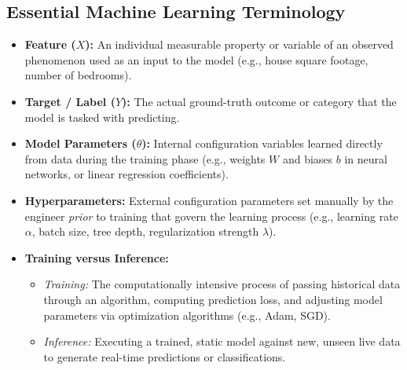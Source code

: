 \subsection{Essential Machine Learning Terminology}
\begin{itemize}
    \item \textbf{Feature ($X$):} An individual measurable property or variable of an observed phenomenon used as an input to the model (e.g., house square footage, number of bedrooms).
    \item \textbf{Target / Label ($Y$):} The actual ground-truth outcome or category that the model is tasked with predicting.
    \item \textbf{Model Parameters ($\theta$):} Internal configuration variables learned directly from data during the training phase (e.g., weights $W$ and biases $b$ in neural networks, or linear regression coefficients).
    \item \textbf{Hyperparameters:} External configuration parameters set manually by the engineer \textit{prior} to training that govern the learning process (e.g., learning rate $\alpha$, batch size, tree depth, regularization strength $\lambda$).
    \item \textbf{Training versus Inference:}
    \begin{itemize}
        \item \textit{Training:} The computationally intensive process of passing historical data through an algorithm, computing prediction loss, and adjusting model parameters via optimization algorithms (e.g., Adam, SGD).
        \item \textit{Inference:} Executing a trained, static model against new, unseen live data to generate real-time predictions or classifications.
    \end{itemize}
\end{itemize}

